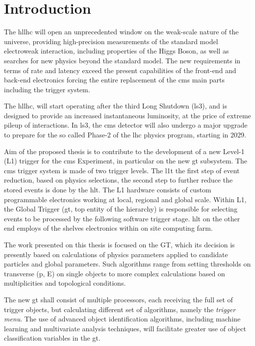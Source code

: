 \documentclass[../../main.tex]{subfiles}
\begin{document}
\chapter{Introduction}
    
\label{sec:introduction}
    
    
The \acrfull{hllhc} will open an unprecedented window on the weak-scale nature of the universe, providing high-precision measurements of the standard model electroweak interaction, including properties of the Higgs Boson, as well as searches for new physics beyond the standard model. The new requirements in terms of rate and latency exceed the present capabilities of the front-end and back-end electronics forcing the entire replacement of the \acrshort{cms} main parts including the trigger system.
    
The \acrshort{hllhc}, will start operating after the third Long Shutdown (\acrshort{ls3}), and is designed to provide an increased instantaneous luminosity, at the price of extreme pileup of interactions. In \acrshort{ls3}, the \acrshort{cms} detector will also undergo a major upgrade to prepare for the so called Phase-2 of the \acrshort{lhc} physics program, starting in 2029.
    
Aim of the proposed thesis is to contribute to the development of a new Level-1 (L1) trigger for the \acrshort{cms} Experiment, in particular on the new \acrfull{gt} subsystem. The \acrshort{cms} trigger system is made of two trigger levels. The \acrfull{l1t} the first step of event reduction, based on physics selections, the second step to further reduce the stored events is done by the \acrfull{hlt}. The L1 hardware consists of custom programmable electronics working at local, regional and global scale. Within L1, the Global Trigger (\acrshort{gt}, top entity of the hierarchy) is responsible for selecting events to be processed by the following software trigger stage. \acrshort{hlt} on the other end employs of the shelves electronics within on site computing farm. 
    
The work presented on this thesis is focused on the GT, which its decision is presently based on calculations of physics parameters applied to candidate particles and global parameters. Such algorithms range from setting thresholds on transverse (p, E) on single objects to more complex calculations based on multiplicities and topological conditions.  
    
The new \acrshort{gt} shall consist of multiple processors, each receiving the full set of trigger objects, but calculating different set of algorithms, namely the \textit{trigger menu}. The use of advanced object identification algorithms, including machine learning and multivariate analysis techniques, will facilitate greater use of object classification variables in the \acrshort{gt}.
    
\end{document}
